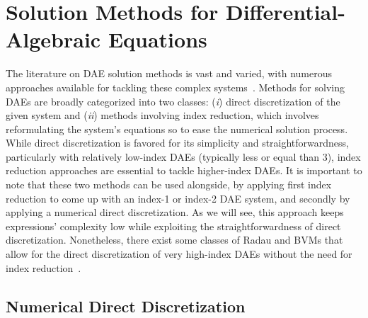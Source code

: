 
\section[Solution Methods for DAEs]{Solution Methods for Differential-Algebraic Equations}

The literature on \ac{DAE} solution methods is vast and varied, with numerous approaches available for tackling these complex systems~\cite{brenan1995numerical, griepentrog1986differential, hairer1993solving, hairer1996solving}. Methods for solving \acp{DAE} are broadly categorized into two classes: (\emph{i}) direct discretization of the given system and (\emph{ii}) methods involving index reduction, which involves reformulating the system's equations so to ease the numerical solution process. While direct discretization is favored for its simplicity and straightforwardness, particularly with relatively low-index \acp{DAE} (typically less or equal than 3), index reduction approaches are essential to tackle higher-index \acp{DAE}. It is important to note that these two methods can be used alongside, by applying first index reduction to come up with an index-1 or index-2 \ac{DAE} system, and secondly by applying a numerical direct discretization. As we will see, this approach keeps expressions' complexity low while exploiting the straightforwardness of direct discretization. Nonetheless, there exist some classes of Radau and \acp{BVM} that allow for the direct discretization of very high-index \acp{DAE} without the need for index reduction~\cite{martinvaquero2010radau, amodio1993boundary, amodio1997parallel, amodio1998algorithm}.

\subsection{Numerical Direct Discretization}

